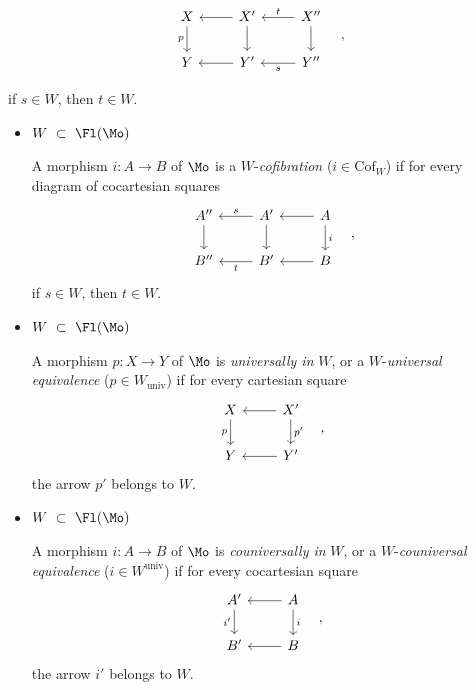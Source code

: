 
\[
\begin{tikzcd}
X \arrow[d, "p"'] & X' \arrow[l] \arrow[d] & X'' \arrow[l, "t"'] \arrow[d] \\
Y & Y' \arrow[l] & Y'' \arrow[l, "s"]
\end{tikzcd}
\quad ,
\]

if $s \in W$, then $t \in W$.

\begin{itemize}
\item[\textbullet] $W \ \subset\ \Fl(\Mo)$

A morphism $i : A \longrightarrow B$ of $\Mo$ is a $W$-\textit{cofibration} ($i \in \mathrm{Cof}_W$) if for every diagram of cocartesian squares
\[
\begin{tikzcd}
A'' \arrow[d] & A' \arrow[l, "s"'] \arrow[d] & A \arrow[l] \arrow[d, "i"] \\
B'' & B' \arrow[l, "t"] & B \arrow[l]
\end{tikzcd}
\quad ,
\]
if $s \in W$, then $t \in W$.

\item[\textbullet] $W \ \subset\ \Fl(\Mo)$

A morphism $p : X \longrightarrow Y$ of $\Mo$ is \textit{universally in} $W$, or a $W$-\textit{universal equivalence} ($p \in W_{\mathrm{univ}}$) if for every cartesian square
\[
\begin{tikzcd}
X \arrow[d, "p"'] & X' \arrow[l] \arrow[d, "p'"] \\
Y & Y' \arrow[l]
\end{tikzcd}
\quad ,
\]
the arrow $p'$ belongs to $W$.

\item[\textbullet] $W \ \subset\ \Fl(\Mo)$

A morphism $i : A \longrightarrow B$ of $\Mo$ is \textit{couniversally in} $W$, or a $W$-\textit{couniversal equivalence} ($i \in W^{\mathrm{univ}}$) if for every cocartesian square
\[
\begin{tikzcd}
A' \arrow[d, "i'"'] & A \arrow[l] \arrow[d, "i"] \\
B' & B \arrow[l]
\end{tikzcd}
\quad ,
\]
the arrow $i'$ belongs to $W$.
\end{itemize}


